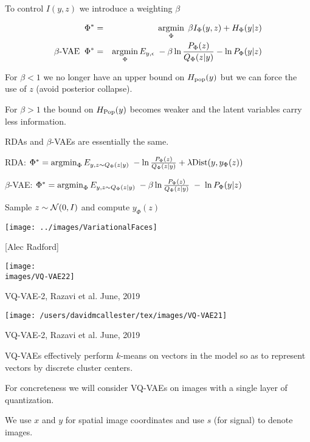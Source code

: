 {To control $I(y,z)$ we introduce a weighting $\beta$

\begin{eqnarray*}
\Phi^* & = & \operatorname*{argmin}_\Phi \; \beta I_\Phi(y,z) + H_\Phi(y|z) \\
\mbox{$\beta$-VAE}\;\; \Phi^* & = & \operatorname*{argmin}_\Phi E_{y,\epsilon}\;-\beta \ln \frac{P_\Phi(z)}{Q_\Phi(z|y)} - \ln P_\Phi(y|z)
\end{eqnarray*}

\vfill
For $\beta < 1$ we no longer have an upper bound on $H_{\mathrm{pop}}(y)$ but we can force the use of $z$ (avoid posterior collapse).

\vfill
For $\beta > 1$ the bound on $H_{\mathrm{Pop}}(y)$ becomes weaker and the latent variables carry less information.


RDAs and $\beta$-VAEs are essentially the same.

\vfill
RDA: $\Phi^* = \operatorname*{argmin}_\Phi E_{y,z \sim Q_\Phi(z|y)}\;-\ln \frac{P_\Phi(z)}{Q_\Phi(z|y)} + \lambda \mathrm{Dist}(y,y_\Phi(z))$

\vfill
$\beta$-VAE: $\Phi^* = \operatorname*{argmin}_\Phi E_{y,z \sim Q_\Phi(z|y)}\;-\beta \ln \frac{P_\Phi(z)}{Q_\Phi(z|y)} \;-\;\ln P_\Phi(y|z)$


\centerline{Sample {\color{red} $z \sim {\cal N}(0,I)$} and compute {\color{red} $y_\Phi(z)$}}

\vfill
\centerline{\texttt{[image: ../images/VariationalFaces]}}
\centerline{[Alec Radford]}


\centerline{\texttt{[image: \\images/VQ-VAE22]}}

\vfill
VQ-VAE-2, Razavi et al. June, 2019


\centerline{\texttt{[image: /users/davidmcallester/tex/images/VQ-VAE21]}}

\vfill
VQ-VAE-2, Razavi et al. June, 2019



VQ-VAEs effectively perform $k$-means on vectors in the model so as to represent vectors by discrete cluster centers.

\vfill
For concreteness we will consider VQ-VAEs on images with a single layer of quantization.

\vfill
We use $x$ and $y$ for spatial image coordinates and use $s$ (for signal) to denote images.

}
